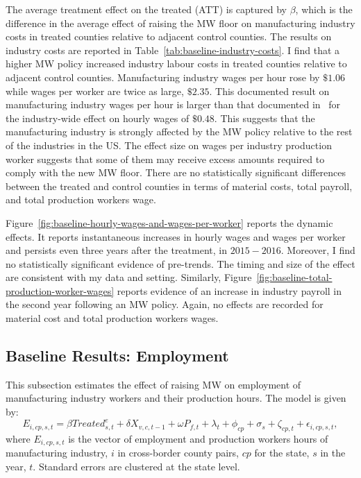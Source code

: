 \documentclass[12pt, english]{article}
\begin{document}
    The average treatment effect on the treated (ATT) is captured by $\beta$, which is the difference in the average effect of raising the MW floor on manufacturing industry costs in treated counties relative to adjacent control counties. The results on industry costs are reported in Table~\ref{tab:baseline-industry-costs}. I find that a higher MW policy increased industry labour costs in treated counties relative to adjacent control counties. Manufacturing industry wages per hour rose by $\$1.06$ while wages per worker are twice as large, $\$2.35$. This documented result on manufacturing industry wages per hour is larger than that documented in~\cite{gopalan2021state} for the industry-wide effect on hourly wages of $\$0.48$. This suggests that the manufacturing industry is strongly affected by the MW policy relative to the rest of the industries in the US. The effect size on wages per industry production worker suggests that some of them may receive excess amounts required to comply with the new MW floor. There are no statistically significant differences between the treated and control counties in terms of material costs, total payroll, and total production workers wage.
    

    Figure~\ref{fig:baseline-hourly-wages-and-wages-per-worker} reports the dynamic effects. It reports instantaneous increases in hourly wages and wages per worker and persists even three years after the treatment, in $2015-2016$. Moreover, I find no statistically significant evidence of pre-trends. The timing and size of the effect are consistent with my data and setting. Similarly, Figure~\ref{fig:baseline-total-production-worker-wages} reports evidence of an increase in industry payroll in the second year following an MW policy. Again, no effects are recorded for material cost and total production workers wages.
    

    \subsection{Baseline Results: Employment}\label{subsec:baseline-results-employment}
    This subsection estimates the effect of raising MW on employment of manufacturing industry workers and their production hours. The model is given by:
    \begin{equation}
        E_{i,cp,s,t} = \beta Treated_{s,t}^e + \delta X_{v,c,t-1} + \omega P_{f,t} + \lambda_{t} + \phi_{cp} + \sigma_{s} + \zeta_{cp,t} + \epsilon_{i,cp,s,t},\label{eq:baseline-emp-hours}
    \end{equation}
    where $E_{i,cp,s,t}$ is the vector of employment and production workers hours of manufacturing industry, $i$ in cross-border county pairs, $cp$ for the state, $s$ in the year, $t$. Standard errors are clustered at the state level.
    
\end{document}
